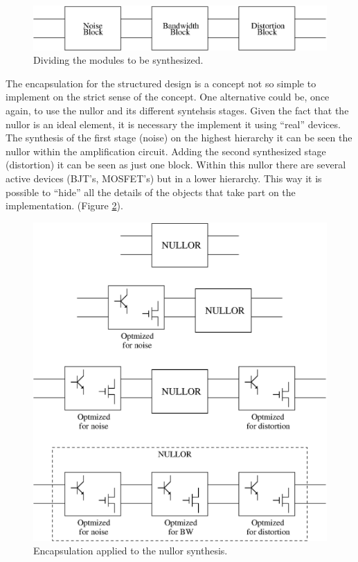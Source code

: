 \documentclass[twocolumn]{IEEEtran}
\begin{document}
\begin{figure}[hbtp]
	\centering
	\includegraphics[scale=0.5]{figures/basic_blocks.eps}
	\caption{Dividing the modules to be synthesized.}
	\label{fig:nullor_1}
\end{figure}

The encapsulation for the structured design is a concept not so simple to implement on the strict sense of the concept. One alternative could be, once again, to use the nullor and its different syntehsis stages. Given the fact that the nullor is an ideal element, it is necessary the implement it using ``real'' devices. The synthesis of the first stage (noise) on the highest hierarchy it can be seen the nullor within the amplification circuit. Adding the second synthesized stage (distortion) it can be seen as just one block. Within this nullor there are several active devices (BJT's, MOSFET's) but in a lower hierarchy. This way it is possible to ``hide'' all the details of the objects that take part on the implementation. (Figure \ref{fig:nullor}).

\begin{figure}[hbtp]
	\centering
	\includegraphics[scale=.5]{figures/synthesis_process.eps}
	\caption{Encapsulation applied to the nullor synthesis.}
	\label{fig:nullor}
\end{figure}
\end{document}
